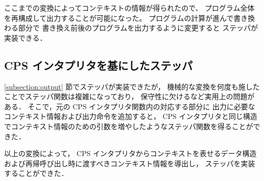 ここまでの変換によってコンテキストの情報が得られたので、
プログラム全体を再構成して出力することが可能になった。
プログラムの計算が進んで書き換わる部分で
書き換え前後のプログラムを出力するように変更すると
ステッパが実装できる．

\subsection{CPS インタプリタを基にしたステッパ}
\label{subsection:stepper}

\ref{subsection:output} 節でステッパが実装できたが，
機械的な変換を何度も施したことでステッパ関数は複雑になっており，
保守性に欠けるなど実用上の問題がある．
そこで，元の CPS インタプリタ関数内の対応する部分に
出力に必要なコンテキスト情報および出力命令を追加すると，
CPS インタプリタと同じ構造でコンテキスト情報のための引数を増やしたようなステッパ関数を得ることができた．

以上の変換によって，
CPS インタプリタからコンテキストを表せるデータ構造および再帰呼び出し時に渡すべきコンテキスト情報を導出し，
ステッパを実装することができた．
